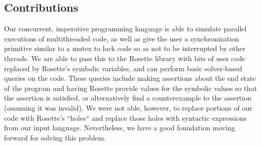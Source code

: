 \subsection{Contributions}
Our concurrent, imperative programming language is able to simulate parallel executions of multithreaded code, as well as give the user a synchronization primitive similar to a mutex to lock code so as not to be interrupted by other threads.  We are able to pass this to the Rosette library with bits of user code replaced by Rosette's symbolic variables, and can perform basic solver-based queries on the code.  These queries include making assertions about the end state of the program and having Rosette provide values for the symbolic values so that the assertion is satisfied, or alternatively find a counterexample to the assertion (assuming it was invalid).  We were not able, however, to replace portions of our code with Rosette's ``holes`` and replace those holes with syntactic expressions from our input language.  Nevertheless, we have a good foundation moving forward for solving this problem.  
